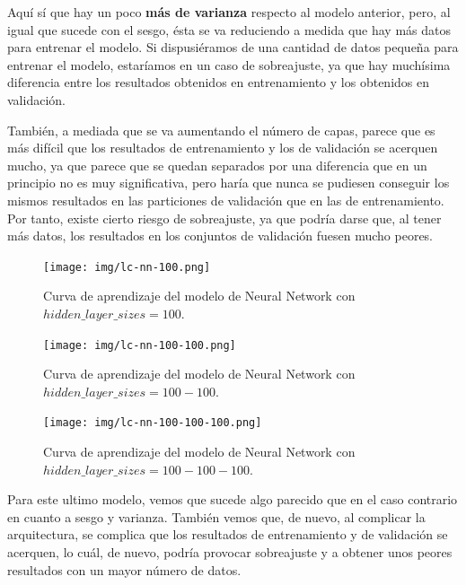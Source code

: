\documentclass[11pt,a4paper]{article}
\begin{document}
Aquí sí que hay un poco \textbf{más de varianza} respecto al modelo anterior, pero, al igual que sucede con
el sesgo, ésta se va reduciendo a medida que hay más datos para entrenar el modelo. Si dispusiéramos de una cantidad de datos pequeña para entrenar el
modelo, estaríamos en un caso de sobreajuste, ya que hay muchísima diferencia entre los resultados obtenidos en entrenamiento y los obtenidos en validación.

También, a mediada que se va aumentando el número de capas, parece que es más difícil que los resultados de entrenamiento y los de validación se acerquen
mucho, ya que parece que se quedan separados por una diferencia que en un principio no es muy significativa, pero haría que nunca se pudiesen conseguir los
mismos resultados en las particiones de validación que en las de entrenamiento. Por tanto, existe cierto riesgo de sobreajuste, ya que podría darse
que, al tener más datos, los resultados en los conjuntos de validación fuesen mucho peores.

\begin{figure}[H]
\centering
\begin{minipage}{.5\textwidth}
    \centering
    \texttt{[image: img/lc-nn-100.png]}
    \caption{Curva de aprendizaje del modelo de Neural Network con $hidden\_layer\_sizes=100$.}
    \label{fig:lc-nn-100}
\end{minipage}%
\begin{minipage}{.5\textwidth}
    \centering
    \texttt{[image: img/lc-nn-100-100.png]}
    \caption{Curva de aprendizaje del modelo de Neural Network con $hidden\_layer\_sizes=100-100$.}
    \label{fig:lc-nn-100-100}
\end{minipage}
\end{figure}

\begin{figure}[H]
    \centering
    \texttt{[image: img/lc-nn-100-100-100.png]}
    \caption{Curva de aprendizaje del modelo de Neural Network con $hidden\_layer\_sizes=100-100-100$.}
    \label{fig:lc-nn-100-100-100}
\end{figure}

Para este ultimo modelo, vemos que sucede algo parecido que en el caso contrario en cuanto a sesgo y varianza. También vemos que, de nuevo, al
complicar la arquitectura, se complica que los resultados de entrenamiento y de validación se acerquen, lo cuál, de nuevo, podría provocar sobreajuste
y a obtener unos peores resultados con un mayor número de datos.

\newpage
\end{document}
